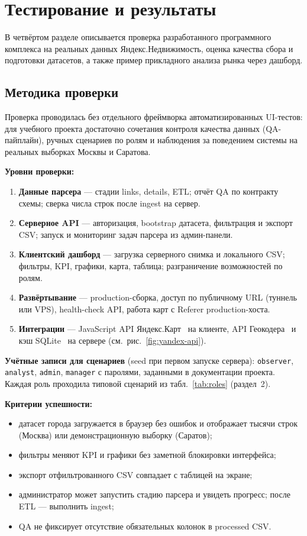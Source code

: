 \section{Тестирование и результаты}

В четвёртом разделе описывается проверка разработанного программного комплекса на реальных данных Яндекс.Недвижимость, оценка качества сбора и подготовки датасетов, а также пример прикладного анализа рынка через дашборд.

\subsection{Методика проверки}

Проверка проводилась без отдельного фреймворка автоматизированных UI-тестов: для учебного проекта достаточно сочетания контроля качества данных (QA-пайплайн), ручных сценариев по ролям и наблюдения за поведением системы на реальных выборках Москвы и Саратова.

\textbf{Уровни проверки:}
\begin{enumerate}
    \item \textbf{Данные парсера} --- стадии links, details, ETL; отчёт QA по контракту схемы; сверка числа строк после ingest на сервер.
    \item \textbf{Серверное API} --- авторизация, bootstrap датасета, фильтрация и экспорт CSV; запуск и мониторинг задач парсера из админ-панели.
    \item \textbf{Клиентский дашборд} --- загрузка серверного снимка и локального CSV; фильтры, KPI, графики, карта, таблица; разграничение возможностей по ролям.
    \item \textbf{Развёртывание} --- production-сборка, доступ по публичному URL (туннель или VPS), health-check API, работа карт с Referer production-хоста.
    \item \textbf{Интеграции} --- JavaScript API Яндекс.Карт~\cite{yandex-maps-api} на клиенте, API Геокодера~\cite{yandex-geocoder} и кэш SQLite~\cite{sqlite} на сервере (см.~рис.~\ref{fig:yandex-api}).
\end{enumerate}

\textbf{Учётные записи для сценариев} (seed при первом запуске сервера): \texttt{observer}, \texttt{analyst}, \texttt{admin}, \texttt{manager} с паролями, заданными в документации проекта. Каждая роль проходила типовой сценарий из табл.~\ref{tab:roles} (раздел~2).

\textbf{Критерии успешности:}
\begin{itemize}
    \item датасет города загружается в браузер без ошибок и отображает тысячи строк (Москва) или демонстрационную выборку (Саратов);
    \item фильтры меняют KPI и графики без заметной блокировки интерфейса;
    \item экспорт отфильтрованного CSV совпадает с таблицей на экране;
    \item администратор может запустить стадию парсера и увидеть прогресс; после ETL --- выполнить ingest;
    \item QA не фиксирует отсутствие обязательных колонок в processed CSV.
\end{itemize}

